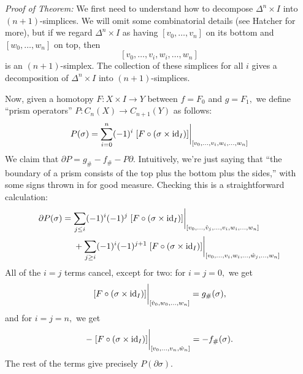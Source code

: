 \documentclass{article}
\begin{document}
\emph{Proof of Theorem:} We first need to understand how to decompose $\Delta^n \times I$ into $(n+1)$-simplices. We will omit some combinatorial details (see Hatcher for more), but if we regard $\Delta^n \times I$ as having $[v_0, \dots, v_n]$ on its bottom and $[w_0, \dots, w_n]$ on top, then%
\noindent\noindent\[%
[v_0, \dots, v_i, w_i, \dots, w_n]
\]%
\noindent{}is an $(n+1)$-simplex. The collection of these simplices for all $i$ gives a decomposition of $\Delta^n \times I$ into $(n+1)$-simplices.

Now, given a homotopy $F: X \times I \to Y$ between $f = F_0$ and $g = F_1,$ we define \textquotedblleft{}prism operators\textquotedblright{} $P: C_n(X) \to C_{n+1}(Y)$ as follows:%
\noindent\noindent\[%
P(\sigma) = \sum_{i=0}^n (-1)^i \eval{\qty[F \circ (\sigma \times \id_I)]}_{[v_0, \dots, v_i, w_i, \dots, w_n]}
\]%
\noindent{}We claim that $\partial P = g_\# - f_\# - P\partial.$ Intuitively, we're just saying that \textquotedblleft{}the boundary of a prism consists of the top plus the bottom plus the sides,\textquotedblright{} with some signs thrown in for good measure. Checking this is a straightforward calculation:
\noindent\noindent\[%
\begin{aligned}
\partial P(\sigma) &= \sum_{j \le i} (-1)^i (-1)^j
\eval{[F \circ (\sigma \times \id_I)]}_{
  [v_0, \dots, \hat{v}_j, \dots, v_i, w_i, \dots, w_n]} \\
&\phantom{{}={}} + \sum_{j \ge i} (-1)^i (-1)^{j+1}
\eval{[F \circ (\sigma \times \id_I)]}_{
  [v_0, \dots, v_i, w_i, \dots, \hat{w}_j, \dots, w_n]}
\end{aligned}
\]%
\noindent{}All of the $i=j$ terms cancel, except for two: for $i=j=0,$ we get
\noindent\noindent\[%
\eval{[F \circ (\sigma \times \id_I)]}_{
  [\hat{v}_0, w_0, \dots, w_n]} = g_\#(\sigma),
\]%
\noindent{}and for $i=j=n,$ we get
\noindent\noindent\[%
-\eval{[F \circ (\sigma \times \id_I)]}_{
  [v_0, \dots, v_n, \hat{w}_n]} = -f_\#(\sigma).
\]%
\noindent{}The rest of the terms give precisely $P(\partial\sigma).$
\end{document}
